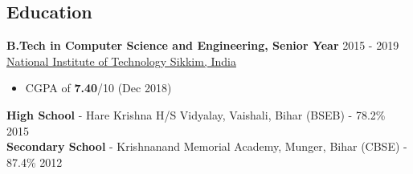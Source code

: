 \documentclass[margin, centered]{res}
\begin{document}
    \begin{resume}
        \section{Education}
            \textbf{B.Tech in Computer Science and Engineering, Senior Year} \hfill 2015 - 2019 \\
            \href{https://www.nitsikkim.ac.in/}{National Institute of Technology Sikkim, India}
            \begin{itemize}
                \item CGPA of \textbf{7.40}/10 (Dec 2018)
            \end{itemize}
            \textbf{High School} - Hare Krishna H/S Vidyalay, Vaishali, Bihar (BSEB) - 78.2\% \hfill 2015 \\
            \textbf{Secondary School} - Krishnanand Memorial Academy, Munger, Bihar (CBSE) - 87.4\% \hfill 2012


\end{resume}
\end{document}

